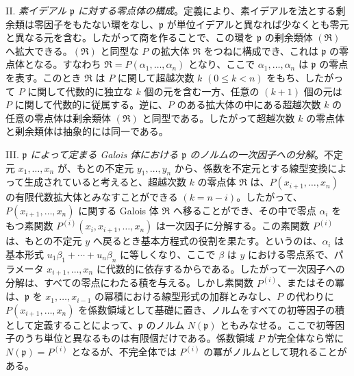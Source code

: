 \documentclass[11pt]{article}
\begin{document}
II. \emph{素イデアル $\mathfrak p$ に対する零点体の構成}。定義により、素イデアルを法とする剰余類は零因子をもたない環をなし、$\mathfrak p$ が単位イデアルと異なれば少なくとも零元と異なる元を含む。したがって商を作ることで、この環を $\mathfrak p$ の剰余類体 $(\mathfrak R)$ へ拡大できる。$(\mathfrak R)$ と同型な $P$ の拡大体 $\mathfrak R$ をつねに構成でき、これは $\mathfrak p$ の零点体となる。すなわち $\mathfrak R=P(\alpha_1,\ldots,\alpha_n)$ となり、ここで $\alpha_1,\ldots,\alpha_n$ は $\mathfrak p$ の零点を表す。このとき $\mathfrak R$ は $P$ に関して超越次数 $k$ $(0\leq k<n)$ をもち、したがって $P$ に関して代数的に独立な $k$ 個の元を含む一方、任意の $(k+1)$ 個の元は $P$ に関して代数的に従属する。逆に、$P$ のある拡大体の中にある超越次数 $k$ の任意の零点体は剰余類体 $(\mathfrak R)$ と同型である。したがって超越次数 $k$ の零点体と剰余類体は抽象的には同一である。

III. \emph{$\mathfrak p$ によって定まる Galois 体における $\mathfrak p$ のノルムの一次因子への分解}。不定元 $x_1,\ldots,x_n$ が、もとの不定元 $y_1,\ldots,y_n$ から、係数を不定元とする線型変換によって生成されていると考えると、超越次数 $k$ の零点体 $\mathfrak R$ は、$P(x_{i+1},\ldots,x_n)$ の有限代数拡大体とみなすことができる $(k=n-i)$。したがって、$P(x_{i+1},\ldots,x_n)$ に関する Galois 体 $\mathfrak R$ へ移ることができ、その中で零点 $\alpha_i$ をもつ素関数 $P^{(i)}(x_i,x_{i+1},\ldots,x_n)$ は一次因子に分解する。この素関数 $P^{(i)}$ は、もとの不定元 $y$ へ戻るとき基本方程式の役割を果たす。というのは、$\alpha_i$ は基本形式 $u_1\beta_1+\cdots+u_n\beta_n$ に等しくなり、ここで $\beta$ は $y$ における零点系で、パラメータ $x_{i+1},\ldots,x_n$ に代数的に依存するからである。したがって一次因子への分解は、すべての零点にわたる積を与える。しかし素関数 $P^{(i)}$、またはその冪は、$\mathfrak p$ を $x_1,\ldots,x_{i-1}$ の冪積における線型形式の加群とみなし、$P$ の代わりに $P(x_{i+1},\ldots,x_n)$ を係数領域として基礎に置き、ノルムをすべての初等因子の積として定義することによって、$\mathfrak p$ のノルム $N(\mathfrak p)$ ともみなせる。ここで初等因子のうち単位と異なるものは有限個だけである。係数領域 $P$ が完全体なら常に $N(\mathfrak p)=P^{(i)}$ となるが、不完全体では $P^{(i)}$ の冪がノルムとして現れることがある。
\end{document}
